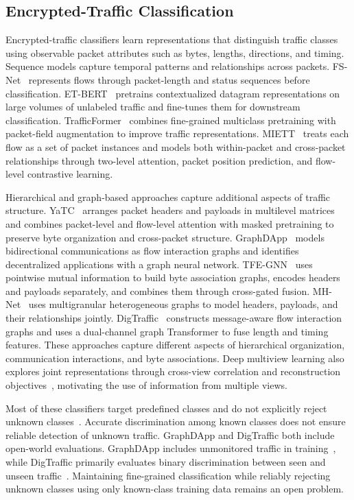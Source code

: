 \documentclass[journal]{IEEEtran}
\newcommand{\bluecite}[1]{\textcolor{blue}{\cite{#1}}}
\begin{document}
\subsection{Encrypted-Traffic Classification}
Encrypted-traffic classifiers learn representations that distinguish traffic classes using observable packet attributes such as bytes, lengths, directions, and timing. Sequence models capture temporal patterns and relationships across packets. FS-Net~\bluecite{fsnet} represents flows through packet-length and status sequences before classification. ET-BERT~\bluecite{ch2-1} pretrains contextualized datagram representations on large volumes of unlabeled traffic and fine-tunes them for downstream classification. TrafficFormer~\bluecite{ch2-2} combines fine-grained multiclass pretraining with packet-field augmentation to improve traffic representations. MIETT~\bluecite{ch2-3} treats each flow as a set of packet instances and models both within-packet and cross-packet relationships through two-level attention, packet position prediction, and flow-level contrastive learning.

Hierarchical and graph-based approaches capture additional aspects of traffic structure. YaTC~\bluecite{ch2-4} arranges packet headers and payloads in multilevel matrices and combines packet-level and flow-level attention with masked pretraining to preserve byte organization and cross-packet structure. GraphDApp~\bluecite{ch2-5} models bidirectional communications as flow interaction graphs and identifies decentralized applications with a graph neural network. TFE-GNN~\bluecite{ch2-6} uses pointwise mutual information to build byte association graphs, encodes headers and payloads separately, and combines them through cross-gated fusion. MH-Net~\bluecite{ch2-7} uses multigranular heterogeneous graphs to model headers, payloads, and their relationships jointly. DigTraffic~\bluecite{ch2-8} constructs message-aware flow interaction graphs and uses a dual-channel graph Transformer to fuse length and timing features. These approaches capture different aspects of hierarchical organization, communication interactions, and byte associations. Deep multiview learning also explores joint representations through cross-view correlation and reconstruction objectives~\bluecite{deep-multiview}, motivating the use of information from multiple views.

Most of these classifiers target predefined classes and do not explicitly reject unknown classes~\bluecite{ch2-1,ch2-2,ch2-3,ch2-4,ch2-6,ch2-7}. Accurate discrimination among known classes does not ensure reliable detection of unknown traffic. GraphDApp and DigTraffic both include open-world evaluations. GraphDApp includes unmonitored traffic in training~\bluecite{ch2-5}, while DigTraffic primarily evaluates binary discrimination between seen and unseen traffic~\bluecite{ch2-8}. Maintaining fine-grained classification while reliably rejecting unknown classes using only known-class training data remains an open problem.
\end{document}
